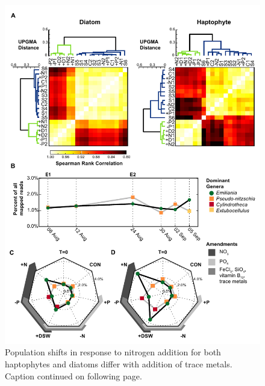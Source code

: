 \begin{figure}[p!]
  \centering
    \includegraphics[width=1\textwidth]{Images/C5_Figure1_v2.pdf}
    \caption[Population shifts in response to nitrogen addition for both haptophytes and diatoms]{Population shifts in response to nitrogen addition for both haptophytes and diatoms differ with addition of trace metals. Caption continued on following page.}
  \label{fig:c5f1}
\end{figure}

